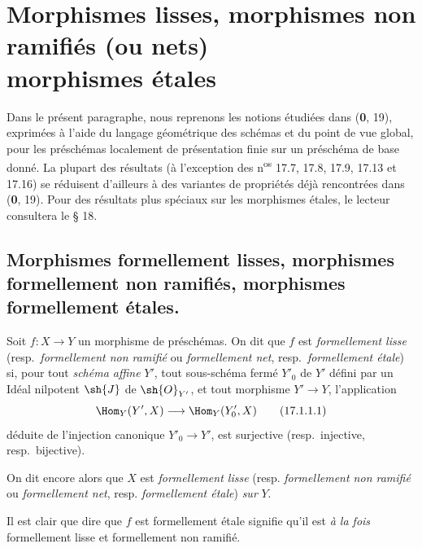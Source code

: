 \section[Morphismes lisses, morphismes non ramifiés (ou nets) morphismes étales]{Morphismes lisses, morphismes non ramifiés (ou nets)\\morphismes étales}
\label{section:IV.17}

Dans le présent paragraphe, nous reprenons les notions étudiées dans (\textbf{0}, 19), exprimées à l'aide du langage géométrique des schémas et du point de vue global, pour les préschémas localement de présentation finie sur un préschéma de base donné. La plupart des résultats (à l'exception des n\textsuperscript{os} 17.7, 17.8, 17.9, 17.13 et 17.16) se réduisent d'ailleurs à des variantes de propriétés déjà rencontrées dans (\textbf{0}, 19). Pour des résultats plus spéciaux sur les morphismes étales, le lecteur consultera le § 18.

\subsection{Morphismes formellement lisses, morphismes formellement non ramifiés, morphismes formellement étales.}

\begin{definition}[17.1.1]
Soit $f:X\to Y$ un morphisme de préschémas. On dit que $f$ est \emph{formellement lisse} \textup{(resp.}\ \emph{formellement non ramifié} ou \emph{formellement net}, \textup{resp.}\ \emph{formellement étale}\textup{)} si, pour tout \emph{schéma affine} $Y'$, tout sous-schéma fermé $Y'_0$ de $Y'$ défini par un Idéal nilpotent $\sh{J}$ de $\sh{O}_{Y'}$, et tout morphisme $Y'\to Y$, l'application
\[
\label{IV.17.1.1.1}
  \Hom_Y(Y',X)\longrightarrow\Hom_Y(Y'_0,X)
  \tag{17.1.1.1}
\]
déduite de l'injection canonique $Y'_0\to Y'$, est surjective \textup{(resp.}\ injective, \textup{resp.}\ bijective\textup{)}.
\end{definition}

On dit encore alors que $X$ est \emph{formellement lisse} (resp. \emph{formellement non ramifié} ou \emph{formellement net}, resp. \emph{formellement étale}) \emph{sur} $Y$.

Il est clair que dire que $f$ est formellement étale signifie qu'il est \emph{à la fois} formellement lisse et formellement non ramifié.

